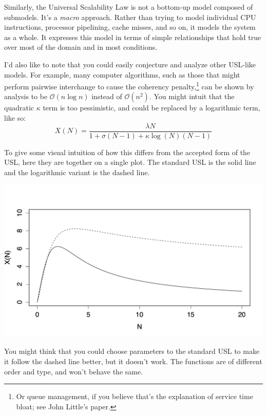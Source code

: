 \documentclass{vivid_layout}
\begin{document}
Similarly, the Universal Scalability Law is not a bottom-up model composed of
submodels.  It's a {\itshape macro} approach.  Rather than trying to model
individual CPU instructions, processor pipelining, cache misses, and so on, it
models the system as a whole. It expresses this model in terms of simple
relationships that hold true over most of the domain and in most conditions. 

I'd also like to note that you could easily conjecture and analyze other
USL-like models. For example, many computer algorithms, such as those that might
perform pairwise interchange to cause the coherency penalty,\footnote{Or queue
management, if you believe that's the explanation of service time bloat; see
John Little's paper.} can be
shown by analysis to be $\mathcal{O}(n\log{}n)$ instead of $\mathcal{O}(n^2)$.
You might intuit that the quadratic $\kappa$ term is too pessimistic, and could
be replaced by a logarithmic term, like so:
\begin{equation}
X(N) = \frac{\lambda N}{1 + \sigma(N-1) + \kappa \log(N)(N-1)}
\label{usl_log}
\end{equation}

To give some visual intuition of how this differs from the accepted form of the
USL, here they are together on a single plot. The standard USL is the solid line
and the logarithmic variant is the dashed line.
\begin{center}
\includegraphics[width=.85\linewidth]{scalability/logscale}
\end{center}

You might think that you could choose parameters to the standard USL to make it
follow the dashed line better, but it doesn't work. The functions are of
different order and type, and won't behave the same.
\end{document}
